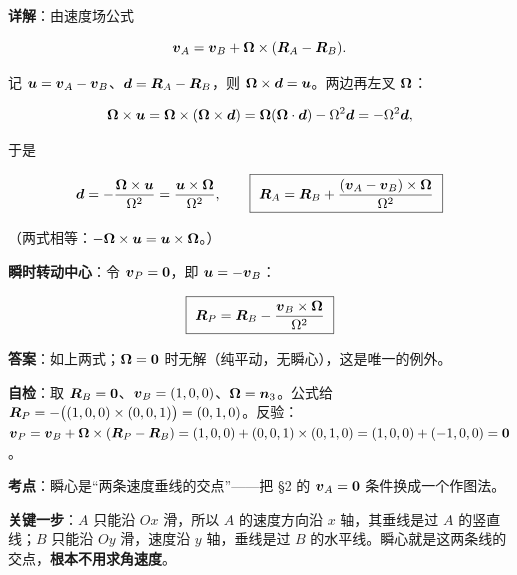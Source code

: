 \documentclass[11pt]{ctexart}
\renewcommand{\qbreak}{\needspace{0.60\textheight}}
\begin{document}
\textbf{详解}：由速度场公式

\[
\boldsymbol{v}_A=\boldsymbol{v}_B+\boldsymbol{\Omega}\times(\boldsymbol{R}_A-\boldsymbol{R}_B).
\]

记 $\boldsymbol{u}=\boldsymbol{v}_A-\boldsymbol{v}_B$、$\boldsymbol{d}=\boldsymbol{R}_A-\boldsymbol{R}_B$，则 $\boldsymbol{\Omega}\times\boldsymbol{d}=\boldsymbol{u}$。两边再左叉 $\boldsymbol{\Omega}$：

\[
\boldsymbol{\Omega}\times\boldsymbol{u}=\boldsymbol{\Omega}\times(\boldsymbol{\Omega}\times\boldsymbol{d})
=\boldsymbol{\Omega}(\boldsymbol{\Omega}\cdot\boldsymbol{d})-\Omega^{2}\boldsymbol{d}=-\Omega^{2}\boldsymbol{d},
\]


于是

\[
\vect{d}=-\frac{\vect{\Omega}\times\vect{u}}{\Omega^{2}}
=\frac{\vect{u}\times\vect{\Omega}}{\Omega^{2}},
\qquad
\boxed{\ \vect{R}_A=\vect{R}_B+\frac{(\vect{v}_A-\vect{v}_B)\times\vect{\Omega}}{\Omega^{2}}\ }
\]

（两式相等：$-\boldsymbol{\Omega}\times\boldsymbol{u}=\boldsymbol{u}\times\boldsymbol{\Omega}$。）

\textbf{瞬时转动中心}：令 $\boldsymbol{v}_P=\boldsymbol{0}$，即 $\boldsymbol{u}=-\boldsymbol{v}_B$：

\[
\boxed{\ \vect{R}_P=\vect{R}_B-\frac{\vect{v}_B\times\vect{\Omega}}{\Omega^{2}}\ }
\]

\textbf{答案}：如上两式；$\boldsymbol{\Omega}=\boldsymbol{0}$ 时无解（纯平动，无瞬心），这是唯一的例外。

\textbf{自检}：取 $\boldsymbol{R}_B=\boldsymbol{0}$、$\boldsymbol{v}_B=(1,0,0)$、$\boldsymbol{\Omega}=\boldsymbol{n}_3$。公式给 $\boldsymbol{R}_P=-\bigl((1,0,0)\times(0,0,1)\bigr)=(0,1,0)$。反验：$\boldsymbol{v}_P=\boldsymbol{v}_B+\boldsymbol{\Omega}\times(\boldsymbol{R}_P-\boldsymbol{R}_B)=(1,0,0)+(0,0,1)\times(0,1,0)=(1,0,0)+(-1,0,0)=\boldsymbol{0}$。

\qbreak
{}


\textbf{考点}：瞬心是“两条速度垂线的交点”——把 §2 的 $\boldsymbol{v}_A=\boldsymbol{0}$ 条件换成一个作图法。

\textbf{关键一步}：$A$ 只能沿 $Ox$ 滑，所以 $A$ 的速度方向沿 $x$ 轴，其垂线是过 $A$ 的竖直线；$B$ 只能沿 $Oy$ 滑，速度沿 $y$ 轴，垂线是过 $B$ 的水平线。瞬心就是这两条线的交点，\textbf{根本不用求角速度}。
\end{document}
